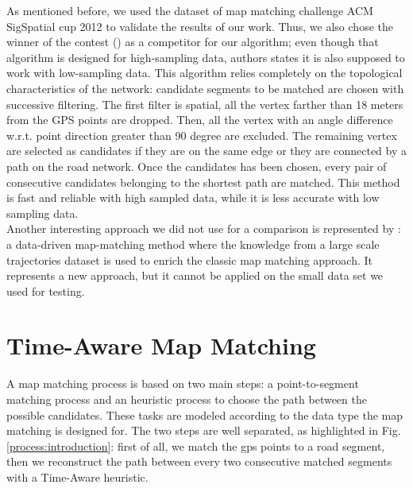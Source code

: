\documentclass[5p]{elsarticle}
\begin{document}
As mentioned before, we used the dataset of map matching challenge ACM SigSpatial cup 2012 to validate the results of our work. Thus, we also chose the winner of the contest (\cite{tang2012efficient}) as a competitor for our algorithm; 
even though that algorithm is designed for high-sampling data, authors states it is also supposed to work with low-sampling data. This algorithm relies completely on the topological characteristics of the network: 
candidate segments to be matched are chosen with successive filtering. The first filter is spatial, all the vertex farther than 18 meters from the GPS points are dropped. Then, all the vertex with an angle difference w.r.t. 
point direction greater than 90 degree are excluded. The remaining vertex are selected as candidates if they are on the same edge or they are connected by a path on the road network. Once the candidates has been chosen, every pair of
consecutive candidates belonging to the shortest path are matched. This method is fast and reliable with high sampled data, while it is less accurate with low sampling data. \\
Another interesting approach we did not use for a comparison is represented by \cite{li2013large}: a data-driven map-matching method where the knowledge from a large scale trajectories dataset is used to 
enrich the classic map matching approach. It represents a new approach, but it cannot be applied on the small data set we used 
for testing.


\section{Time-Aware Map Matching}

A map matching process is based on two main steps: a point-to-segment matching process and an heuristic process to choose the path between the possible candidates. These tasks are 
modeled according to the data type the map matching is designed for. The two steps are well separated, as highlighted in Fig. \ref{process:introduction}: first of all, we match the gps points 
to a road segment, 
then we reconstruct the path between every two consecutive matched segments with a Time-Aware heuristic. 
\end{document}
